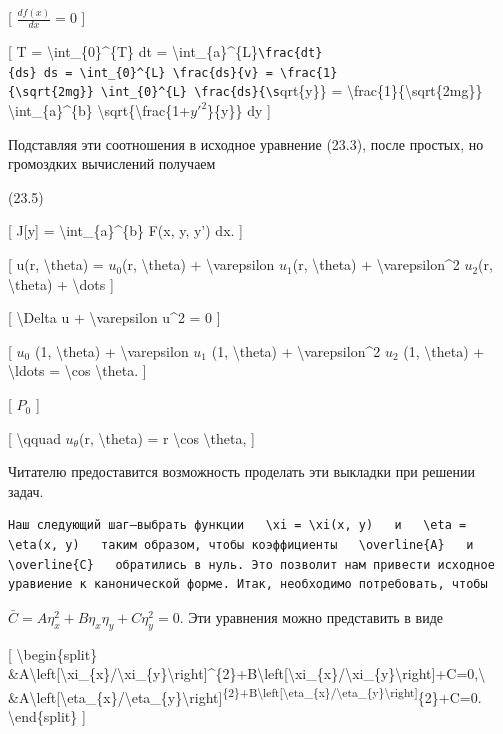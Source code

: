 \documentclass[
]{article}
\begin{document}
{{{[} \(\frac{df(x)}{dx} = 0\) {]}

{[} T = \textbackslash int\_\{0\}\^{}\{T\} dt =
\textbackslash int\_\{a\}\^{}\{L\}\texttt{\textbackslash{}frac\{dt\}\{ds\}\ ds\ =\ \textbackslash{}int\_\{0\}\^{}\{L\}\ \textbackslash{}frac\{ds\}\{v\}\ =\ \textbackslash{}frac\{1\}\{\textbackslash{}sqrt\{2mg\}\}\ \textbackslash{}int\_\{0\}\^{}\{L\}\ \textbackslash{}frac\{ds\}\{\textbackslash{}s}qrt\{y\}\}
= \textbackslash frac\{1\}\{\textbackslash sqrt\{2mg\}\}
\textbackslash int\_\{a\}\^{}\{b\}
\textbackslash sqrt\{\textbackslash frac\{1+\(y'^{2}\)\}\{y\}\} dy {]}

Подставляя эти соотношения в исходное уравнение (23.3), после простых,
но громоздких вычислений получаем

(23.5)

{[} J{[}y{]} = \textbackslash int\_\{a\}\^{}\{b\} F(x, y, y') dx. {]}

{[} u(r, \textbackslash theta) = \(u_0\)(r, \textbackslash theta) +
\textbackslash varepsilon \(u_1\)(r, \textbackslash theta) +
\textbackslash varepsilon\^{}2 \(u_2\)(r, \textbackslash theta) +
\textbackslash dots {]}

{[} \textbackslash Delta u + \textbackslash varepsilon u\^{}2 = 0 {]}

{[} \(u_0\) (1, \textbackslash theta) + \textbackslash varepsilon
\(u_1\) (1, \textbackslash theta) + \textbackslash varepsilon\^{}2
\(u_2\) (1, \textbackslash theta) + \textbackslash ldots =
\textbackslash cos \textbackslash theta. {]}

{[} \(P_{0}\) {]}

{[} \textbackslash qquad \(u_{\theta}\)(r, \textbackslash theta) = r
\textbackslash cos \textbackslash theta, {]}

Читателю предоставится возможность проделать эти выкладки при решении
задач.

\begin{verbatim}
Наш следующий шаг—выбрать функции   \xi = \xi(x, y)   и   \eta = \eta(x, y)   таким образом, чтобы коэффициенты   \overline{A}   и   \overline{C}   обратились в нуль. Это позволит нам привести исходное уравиение к канонической форме. Итак, необходимо потребовать, чтобы
\end{verbatim}

\(\bar{C} = A\eta_x^2 + B\eta_x\eta_y + C\eta_y^2 = 0.\) Эти уравнения
можно представить в виде

{[} \textbackslash begin\{split\}
\&A\textbackslash left{[}\textbackslash xi\_\{x\}/\textbackslash xi\_\{y\}\textbackslash right{]}\^{}\{2\}+B\textbackslash left{[}\textbackslash xi\_\{x\}/\textbackslash xi\_\{y\}\textbackslash right{]}+C=0,\textbackslash{}
\&A\textbackslash left{[}\textbackslash eta\_\{x\}/\textbackslash eta\_\{y\}\textbackslash right{]}\textsuperscript{\{2\}+B\textbackslash left{[}\textbackslash eta\_\{x\}/\textbackslash eta\_\{y\}\textbackslash right{]}}\{2\}+C=0.
\textbackslash end\{split\} {]}

}}
\end{document}
